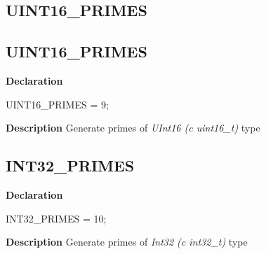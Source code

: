 \documentclass{report}
\newif\ifpdf
\begin{document}
\subsection*{\large{\textbf{UINT16{\_}PRIMES}}\normalsize\hspace{1ex}\hrulefill}
\else
\subsection*{UINT16{\_}PRIMES}
\fi
\label{primesieve-UINT16_PRIMES}
\begin{list}{}{
\setlength{\itemindent}{0cm}
\setlength{\listparindent}{0cm}
\setlength{\leftmargin}{\evensidemargin}
\addtolength{\leftmargin}{\tmplength}
\settowidth{\labelsep}{X}
\addtolength{\leftmargin}{\labelsep}
\setlength{\labelwidth}{\tmplength}
}
\item[\textbf{Declaration}\hfill]
\ifpdf
\begin{flushleft}
\fi
\begin{ttfamily}
UINT16{\_}PRIMES = 9;\end{ttfamily}

\ifpdf
\end{flushleft}
\fi

\par
\item[\textbf{Description}]
Generate primes of \textit{UInt16 (c uint16{\_}t)} type

\end{list}
\ifpdf
\subsection*{\large{\textbf{INT32{\_}PRIMES}}\normalsize\hspace{1ex}\hrulefill}
\else
\subsection*{INT32{\_}PRIMES}
\fi
\label{primesieve-INT32_PRIMES}
\begin{list}{}{
\setlength{\itemindent}{0cm}
\setlength{\listparindent}{0cm}
\setlength{\leftmargin}{\evensidemargin}
\addtolength{\leftmargin}{\tmplength}
\settowidth{\labelsep}{X}
\addtolength{\leftmargin}{\labelsep}
\setlength{\labelwidth}{\tmplength}
}
\item[\textbf{Declaration}\hfill]
\ifpdf
\begin{flushleft}
\fi
\begin{ttfamily}
INT32{\_}PRIMES = 10;\end{ttfamily}

\ifpdf
\end{flushleft}
\fi

\par
\item[\textbf{Description}]
Generate primes of \textit{Int32 (c int32{\_}t)} type

\end{list}
\ifpdf
\end{document}
